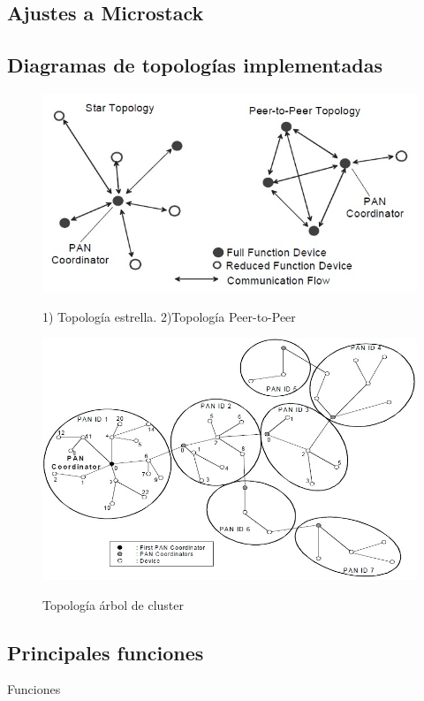 \subsection{Ajustes a Microstack}


\subsection{Diagramas de topologías implementadas}

\begin{figure}[h!]
	\centering
    \includegraphics[width=.8\textwidth]{./Figures/topologia.jpg}
	\label{fig:topo}
	\caption{1) Topología estrella. 2)Topología Peer-to-Peer}
\end{figure}

\begin{figure}[h!]
	\centering
    \includegraphics[width=.8\textwidth]{./Figures/cluster.jpg}
	\label{fig:clust}
	\caption{Topología árbol de cluster}
\end{figure}

\subsection{Principales funciones}

Funciones

